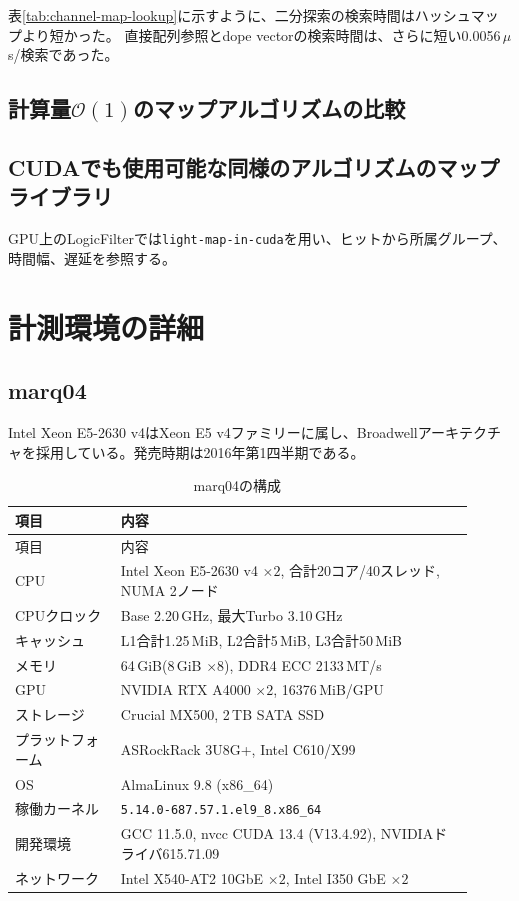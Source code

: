 \documentclass[../main.tex]{subfiles}
\begin{document}
表\ref{tab:channel-map-lookup}に示すように、二分探索の検索時間はハッシュマップより短かった。
直接配列参照とdope vectorの検索時間は、さらに短い0.0056\,$\mu$s/検索であった。

\subsection{計算量$\mathcal{O}(1)$のマップアルゴリズムの比較}

\subsection{CUDAでも使用可能な同様のアルゴリズムのマップライブラリ}
GPU上のLogicFilterでは\lstinline|light-map-in-cuda|を用い、ヒットから所属グループ、時間幅、遅延を参照する。


\section{計測環境の詳細}
\label{sec:appendixB}


\subsection{marq04}
\label{sec:environment-marq04}
Intel Xeon E5-2630 v4はXeon E5 v4ファミリーに属し、Broadwellアーキテクチャを採用している。発売時期は2016年第1四半期である。

\begingroup
\small
\renewcommand{\arraystretch}{1.2}
\begin{longtable}{|p{0.21\linewidth}|p{0.70\linewidth}|}
\caption{marq04の構成}\label{tab:environment-marq04}\\
\hline
項目 & 内容 \\
\hline
\endfirsthead
\hline
項目 & 内容 \\
\hline
\endhead
CPU & Intel Xeon E5-2630 v4 $\times 2$, 合計20コア/40スレッド, NUMA 2ノード \\
\hline
CPUクロック & Base 2.20\,GHz, 最大Turbo 3.10\,GHz \\
\hline
キャッシュ & L1合計1.25\,MiB, L2合計5\,MiB, L3合計50\,MiB \\
\hline
メモリ & 64\,GiB(8\,GiB $\times 8$), DDR4 ECC 2133\,MT/s \\
\hline
GPU & NVIDIA RTX A4000 $\times 2$, 16376\,MiB/GPU \\
\hline
ストレージ & Crucial MX500, 2\,TB SATA SSD \\
\hline
プラットフォーム & ASRockRack 3U8G+, Intel C610/X99 \\
\hline
OS & AlmaLinux 9.8 (x86\_64) \\
\hline
稼働カーネル & \texttt{5.14.0-687.57.1.el9\_8.x86\_64} \\
\hline
開発環境 & GCC 11.5.0, nvcc CUDA 13.4 (V13.4.92), NVIDIAドライバ615.71.09 \\
\hline
ネットワーク & Intel X540-AT2 10GbE $\times 2$, Intel I350 GbE $\times 2$ \\
\hline
\end{longtable}
\endgroup
\end{document}
